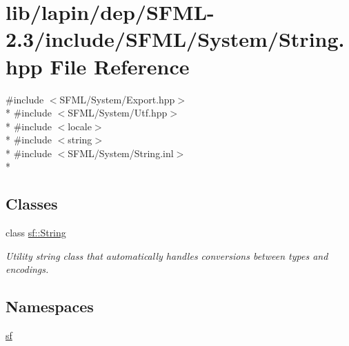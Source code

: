 \hypertarget{lapin_2dep_2_s_f_m_l-2_83_2include_2_s_f_m_l_2_system_2_string_8hpp}{\section{lib/lapin/dep/\-S\-F\-M\-L-\/2.3/include/\-S\-F\-M\-L/\-System/\-String.hpp File Reference}
\label{lapin_2dep_2_s_f_m_l-2_83_2include_2_s_f_m_l_2_system_2_string_8hpp}
}
{\ttfamily \#include $<$S\-F\-M\-L/\-System/\-Export.\-hpp$>$}\\*
{\ttfamily \#include $<$S\-F\-M\-L/\-System/\-Utf.\-hpp$>$}\\*
{\ttfamily \#include $<$locale$>$}\\*
{\ttfamily \#include $<$string$>$}\\*
{\ttfamily \#include $<$S\-F\-M\-L/\-System/\-String.\-inl$>$}\\*
\subsection*{Classes}
\begin{DoxyCompactItemize}
\item 
class \hyperlink{classsf_1_1_string}{sf\-::\-String}
\begin{DoxyCompactList}\small\item\em Utility string class that automatically handles conversions between types and encodings. \end{DoxyCompactList}\end{DoxyCompactItemize}
\subsection*{Namespaces}
\begin{DoxyCompactItemize}
\item 
\hyperlink{namespacesf}{sf}
\end{DoxyCompactItemize}
